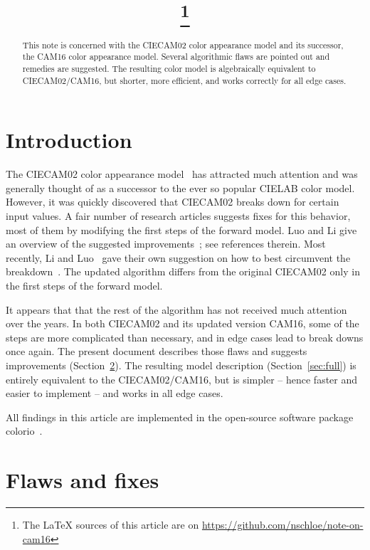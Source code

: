 \documentclass[twocolumn]{scrartcl}
\title{\mytitle\footnote{The LaTeX sources of this article are on \url{https://github.com/nschloe/note-on-cam16}}}
\author{\myauthor}
\theoremstyle{named}
\begin{document}
\maketitle
\begin{abstract}
  This note is concerned with the CIECAM02 color appearance model and its
  successor, the CAM16 color appearance model. Several algorithmic flaws are
  pointed out and remedies are suggested. The resulting color model is
  algebraically equivalent to CIECAM02/CAM16, but shorter, more efficient, and
  works correctly for all edge cases.
\end{abstract}

\section{Introduction}

The CIECAM02 color appearance model~\cite{ciecam02} has attracted much
attention and was generally thought of as a successor to the ever so popular
CIELAB color model. However, it was quickly discovered that CIECAM02 breaks
down for certain input values. A fair number of research articles suggests
fixes for this behavior, most of them by modifying the first steps of the
forward model. Luo and Li give an overview of the suggested
improvements~\cite{ciecam02-recent}; see references therein.  Most recently,
Li and Luo~\cite{cam16} gave their own suggestion on how to best
circumvent the breakdown~\cite{cam16}. The updated algorithm differs from the
original CIECAM02 only in the first steps of the forward model.

It appears that that the rest of the algorithm has not received much attention
over the years. In both CIECAM02 and its updated version CAM16, some of the
steps are more complicated than necessary, and in edge cases lead to break
downs once again. The present document describes those flaws and suggests
improvements (Section~\ref{sec:ff}). The resulting model description
(Section~\ref{sec:full}) is entirely equivalent to the CIECAM02/CAM16, but is
simpler -- hence faster and easier to implement -- and works in all edge
cases.

All findings in this article are implemented in the open-source software package
colorio~\cite{colorio}.


\section{Flaws and fixes}\label{sec:ff}
\end{document}
